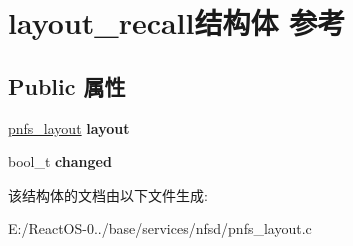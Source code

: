 \hypertarget{structlayout__recall}{}\section{layout\+\_\+recall结构体 参考}
\label{structlayout__recall}
\subsection*{Public 属性}
\begin{DoxyCompactItemize}
\item 
\mbox{\label{structlayout__recall_ad7b9e68f3fad31fc199d6a80303efe49}} 
\hyperlink{struct____pnfs__layout}{pnfs\+\_\+layout} {\bfseries layout}
\item 
\mbox{\label{structlayout__recall_ac68820d1df3320b534a2bfdccca41f03}} 
bool\+\_\+t {\bfseries changed}
\end{DoxyCompactItemize}


该结构体的文档由以下文件生成\+:\begin{DoxyCompactItemize}
\item 
E\+:/\+React\+O\+S-\/0../base/services/nfsd/pnfs\+\_\+layout.\+c\end{DoxyCompactItemize}

